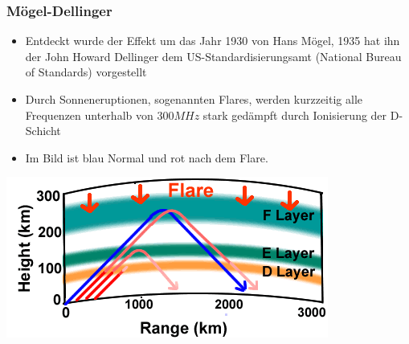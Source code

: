 \begin{frame}
  \frametitle{Mögel-Dellinger}
  \begin{center}
    \begin{itemize}
      \item Entdeckt wurde der Effekt um das Jahr 1930 von Hans Mögel, 1935 hat ihn der John Howard Dellinger dem US-Standardisierungsamt (National Bureau of Standards) vorgestellt
      \item Durch Sonneneruptionen, sogenannten Flares, werden kurzzeitig alle Frequenzen unterhalb von $300MHz$ stark gedämpft durch Ionisierung der D-Schicht
      \item Im Bild ist blau Normal und rot nach dem Flare. \\[1em]
    \end{itemize}
    \includegraphics[width=.6\textwidth,height=.4\textheight,keepaspectratio]{a08/FlareNPS.png}
  \end{center}
\end{frame}

